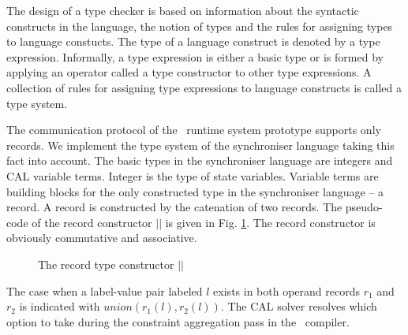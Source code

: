 The design of a type checker is based on information about the syntactic constructs in the language, the notion of types and the rules for assigning types to language constucts. The type of a language construct is denoted by a type expression. Informally, a type expression is either a basic type or is formed by applying an operator called a type constructor to other type expressions. A collection of rules for assigning type expressions to language constructs is called a type system.

The communication protocol of the \ak\ runtime system prototype supports only records. We implement the type system of the synchroniser language taking this fact into account. The basic types in the synchroniser language are integers and CAL variable terms. Integer is the type of state variables. Variable terms are building blocks for the only constructed type in the synchroniser language -- a record. A record is constructed by the catenation of two records. The pseudo-code of the record constructor $||$ is given in Fig. \ref{rec_construc}. The record constructor is obviously commutative and associative.

\begin{figure}[h!]
\noindent{}
\caption{The record type constructor $||$\label{rec_construc}}
\end{figure}

The case when a label-value pair labeled $l$ exists in both operand records $r_1$ and $r_2$ is indicated with $union(r_1(l),r_2(l))$. The CAL solver resolves which option to take during the constraint aggregation pass in the \ak\ compiler.

